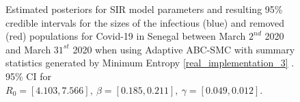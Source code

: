 \documentclass[11pt,a4paper]{article}
\theoremstyle{break}
\begin{document}
  \begin{figure}[H]
    \centering
    \caption{Estimated posteriors for SIR model parameters and resulting 95\% credible intervals for the sizes of the infectious (blue) and removed (red) populations for Covid-19 in Senegal between March $2^{nd}$ 2020 and March $31^{st}$ 2020 when using Adaptive ABC-SMC with summary statistics generated by Minimum Entropy \ref{real_implementation_3} . 95\% CI for $R_0=[4.103,7.566],\ \beta=[0.185,0.211],\ \gamma=[0.049,0.012]$.}
    \label{fig_senegal_me}
  \end{figure}
\end{document}
